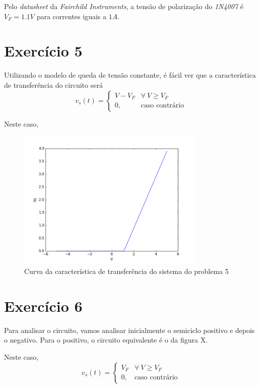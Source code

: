 \documentclass[12pt, a4paper, twoside]{article}
\begin{document}
Pelo \textit{datasheet} da \textit{Fairchild Instruments}, a tensão de polarização
do \textit{1N4007} é $V_F = 1.1V$ para correntes iguais a $1A$.

\section{Exercício 5}


Utilizando o modelo de queda de tensão constante, é fácil ver que a característica
de transferência do circuito será
\begin{equation}
    v_s(t) =
    \begin{cases}
        V - V_F & \forall\ V \geq V_F \\
        0, & \text{caso contrário}
    \end{cases}
\end{equation}

Neste caso,
\begin{figure}
    \centering
    \includegraphics[width=0.8\textwidth]{figs/rel3/ex5.png}
    \caption{Curva da característica de transferência do sistema do problema 5}
\end{figure}

\section{Exercício 6}

Para analisar o circuito, vamos analisar inicialmente o semiciclo positivo e depois
o negativo. Para o positivo, o circuito equivalente é o da figura X.


Neste caso,
\begin{equation}
    v_s(t) =
    \begin{cases}
        V_F & \forall\ V \geq V_F \\
        0, & \text{caso contrário}
    \end{cases}
\end{equation}
\end{document}
